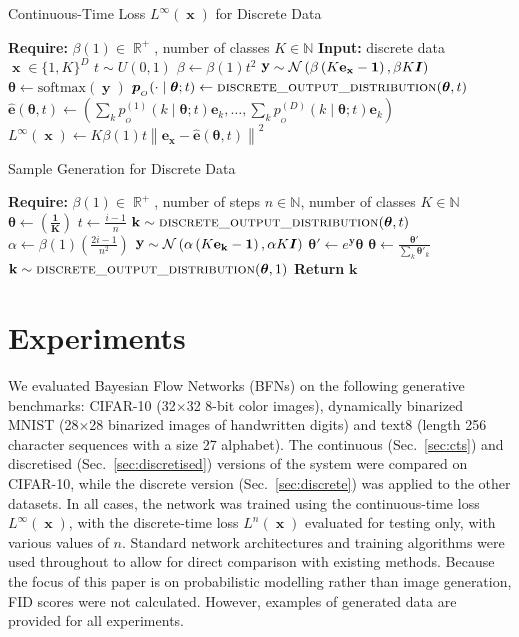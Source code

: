 \documentclass[11pt,table]{article}
\DeclareMathOperator{\x}{\mathbf{x}}
\DeclareMathOperator{\y}{\mathbf{y}}
\renewcommand{\k}{\mathbf{k}}
\newcommand{\N}[2]{\mathcal{N}\left(#1 , #2\right)}
\DeclareMathOperator{\R}{\mathbb{R}}
\newcommand{\I}[1]{\boldsymbol{I}}
\renewcommand{\vec}[1]{\boldsymbol{#1}}
\newcommand{\pars}{\theta}
\newcommand{\parsn}{\vec{\pars}}
\newcommand{\0}[1]{\constvec{0}{#1}}
\newcommand{\1}[1]{\constvec{1}{#1}}
\newcommand{\oh}[2]{\mathbf{e}_{#1}}
\newcommand{\ds}[1]{\{1,#1\}}
\newcommand{\out}{p_{_O}}
\newcommand{\outn}{\vec{p}_{_O}}
\newcommand{\pred}[1]{\hat{#1}}
\begin{document}
\begin{algorithm}[H]
\caption{Continuous-Time Loss $L^{\infty}(\x)$ for Discrete Data}\label{alg:cts_t_loss_disc}
\begin{algorithmic}
\State \textbf{Require:} $\beta(1) \in \R^+$, number of classes $K \in \mathbb{N}$
\State \textbf{Input:} discrete data $\x \in \ds{K}^D$
\State $t \sim U(0,1)$
\State $\beta \leftarrow \beta(1)t^2$
\State $\y \sim \N{\beta\left(K\oh{\x}{KD}-
\1{KD}\right)}{\beta K\I{KD}}$
\State $\parsn \gets \text{softmax}(\y)$
\State $\outn(\cdot \mid \parsn; t) \leftarrow \text{\sc{\lstinline{discrete_output_distribution}}}(\parsn, t)$
\State $\mathbf{\pred{e}}(\parsn, t) \gets \left(\sum_{k}\out^{(1)}(k \mid \parsn; t)\oh{k}{K},\dots,\sum_{k} \out^{(D)}(k \mid \parsn; t)\oh{k}{K}\right)$
\State $ L^{\infty}(\x) \gets K\beta(1)t\left\|\oh{\x}{KD} -\mathbf{\pred{e}}(\parsn, t) \right\|^2$
\end{algorithmic}
\end{algorithm}
\begin{algorithm}[H]
\caption{Sample Generation for Discrete Data}\label{alg:samp_gen_disc}
\begin{algorithmic}
\State \textbf{Require:} $\beta(1) \in \R^+$, number of steps $n \in \mathbb{N}$, number of classes $K \in \mathbb{N}$
\State $\parsn \gets \left(\vec{\frac{1}{K}}\right)$
    \State $t \leftarrow \frac{i-1}{n}$
    \State $\k \sim \text{\sc{\lstinline{discrete_output_distribution}}}(\parsn, t)$
    \State $\alpha \leftarrow \beta(1)\left(\frac{2i -1}{n^2}\right)$
    \State $\y \sim \N{\alpha\left(K\oh{\k}{KD}-
    \1{KD}\right)}{\alpha K\I{KD}}$
    \State $\parsn' \gets e^{\y} \parsn$
    \State $\parsn \gets \frac{\parsn'}{\sum_k \parsn'_k}$
\EndFor
\State $\k \sim \text{\sc{\lstinline{discrete_output_distribution}}}(\parsn, 1)$
\State \textbf{Return} $\k$
\end{algorithmic}
\end{algorithm}
\section{Experiments}\label{sec:experiments}
We evaluated Bayesian Flow Networks (BFNs) on the following generative benchmarks: CIFAR-10 (32$\times$32 8-bit color images), dynamically binarized MNIST (28$\times$28 binarized images of handwritten digits) and text8 (length 256 character sequences with a size 27 alphabet).
The continuous (Sec.~\ref{sec:cts}) and discretised (Sec.~\ref{sec:discretised}) versions of the system were compared on CIFAR-10, while the discrete version (Sec.~\ref{sec:discrete}) was applied to the other datasets.
In all cases, the network was trained using the continuous-time loss $L^{\infty}(\x)$, with the discrete-time loss $L^{n}(\x)$ evaluated for testing only, with various values of $n$.
Standard network architectures and training algorithms were used throughout to allow for direct comparison with existing methods.
Because the focus of this paper is on probabilistic modelling rather than image generation, FID scores were not calculated. However, examples of generated data are provided for all experiments.
\end{document}
